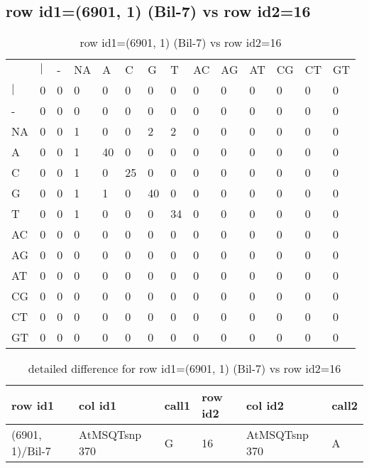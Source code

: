 \subsection{row id1=(6901, 1) (Bil-7) vs row id2=16}
\begin{center}
\begin{longtable}{|l|l|l|l|l|l|l|l|l|l|l|l|l|l|}
\caption{row id1=(6901, 1) (Bil-7) vs row id2=16} \label{table_dm64}\\
\hline
\\
\hline
&$|$&-&NA&A&C&G&T&AC&AG&AT&CG&CT&GT\\
$|$&0&0&0&0&0&0&0&0&0&0&0&0&0\\
-&0&0&0&0&0&0&0&0&0&0&0&0&0\\
NA&0&0&1&0&0&2&2&0&0&0&0&0&0\\
A&0&0&1&40&0&0&0&0&0&0&0&0&0\\
C&0&0&1&0&25&0&0&0&0&0&0&0&0\\
G&0&0&1&1&0&40&0&0&0&0&0&0&0\\
T&0&0&1&0&0&0&34&0&0&0&0&0&0\\
AC&0&0&0&0&0&0&0&0&0&0&0&0&0\\
AG&0&0&0&0&0&0&0&0&0&0&0&0&0\\
AT&0&0&0&0&0&0&0&0&0&0&0&0&0\\
CG&0&0&0&0&0&0&0&0&0&0&0&0&0\\
CT&0&0&0&0&0&0&0&0&0&0&0&0&0\\
GT&0&0&0&0&0&0&0&0&0&0&0&0&0\\
\hline
\end{longtable}
\end{center}

\begin{center}
\begin{longtable}{|l|l|l|l|l|l|}
\caption{detailed difference for row id1=(6901, 1) (Bil-7) vs row id2=16} \label{table_dm65}\\
\hline
row id1&col id1&call1&row id2&col id2&call2\\
\hline
(6901, 1)/Bil-7&AtMSQTsnp 370&G&16&AtMSQTsnp 370&A\\
\hline
\end{longtable}
\end{center}

